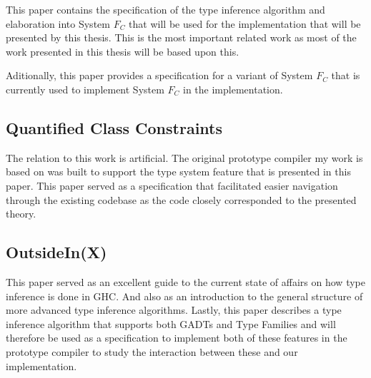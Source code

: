 This paper contains the specification of the type inference algorithm and
elaboration into System $F_C$ that will be used for the implementation that will
be presented by this thesis. This is the most important related work as most of
the work presented in this thesis will be based upon this.

Aditionally, this paper provides a specification for a variant of System $F_C$
that is currently used to implement System $F_C$ in the implementation.

\subsection{Quantified Class Constraints\cite{Bottu:2017:QCC:3156695.3122967}}

The relation to this work is artificial. The original prototype compiler my work
is based on was built to support the type system feature that is presented in
this paper. This paper served as a specification that facilitated easier
navigation through the existing codebase as the code closely corresponded to the
presented theory.

\subsection{OutsideIn(X)\cite{outsideinx-modular-type-inference-with-local-assumptions}}

This paper served as an excellent guide to the current state of affairs on how
type inference is done in GHC. And also as an introduction to the general
structure of more advanced type inference algorithms. Lastly, this paper
describes a type inference algorithm that supports both GADTs and Type Families
and will therefore be used as a specification to implement both of these
features in the prototype compiler to study the interaction between these and
our implementation.
